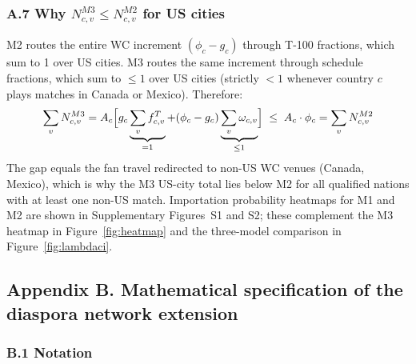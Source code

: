 \documentclass[12pt, a4paper]{article}
\begin{document}
\subsubsection*{A.7 Why $N_{c,v}^{M3} \leq N_{c,v}^{M2}$ for
US cities}

M2 routes the entire WC increment $(\phi_c - g_c)$ through T-100
fractions, which sum to 1 over US cities. M3 routes the same
increment through schedule fractions, which sum to $\leq 1$ over
US cities (strictly $<1$ whenever country $c$ plays matches in
Canada or Mexico). Therefore:
\[
  \sum_{v} N_{c,v}^{M3}
    = A_c \Bigl[
        g_c \underbrace{\sum_v f_{c,v}^T}_{=1}
        + (\phi_c - g_c)
          \underbrace{\sum_v \omega_{c,v}}_{\leq 1}
      \Bigr]
  \;\leq\;
  A_c \cdot \phi_c
    = \sum_v N_{c,v}^{M2}
\]
The gap equals the fan travel redirected to non-US WC venues
(Canada, Mexico), which is why the M3 US-city total lies below
M2 for all qualified nations with at least one non-US match.
Importation probability heatmaps for M1 and M2 are shown in
Supplementary Figures~S1 and S2; these complement the M3 heatmap
in Figure~\ref{fig:heatmap} and the three-model comparison in
Figure~\ref{fig:lambdaci}.

\newpage

\subsection*{Appendix B. Mathematical specification of the diaspora
network extension}

\subsubsection*{B.1 Notation}
\end{document}

